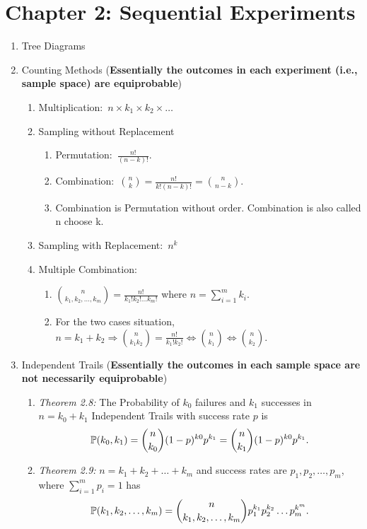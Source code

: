 \section*{Chapter 2: Sequential Experiments}
\begin{enumerate}
    \item Tree Diagrams
    \item Counting Methods (\textbf{Essentially the outcomes in each experiment (i.e., sample space) are equiprobable})
    \begin{enumerate}
        \item Multiplication:~$n\times k_1\times k_2\times \ldots$
        \item Sampling without Replacement
        \begin{enumerate}
            \item Permutation:~$\frac{n!}{(n-k)!}$.
            \item Combination:~$\binom{n}{k}=\frac{n!}{k!(n-k)!}=\binom{n}{n-k}$.
            \item Combination is Permutation without order. Combination is also called n choose k.
        \end{enumerate}
        \item Sampling with Replacement:~$n^k$
        \item Multiple Combination:{
            \begin{enumerate}
                \item $\binom{n}{k_1,k_2,\ldots,k_m}=\frac{n!}{k_1!k_2!\ldots k_m!}$ where $n=\sum_{i=1}^{m}k_i$.
                \item For the two cases situation, $n=k_1+k_2\Rightarrow \binom{n}{k_1k_2}=\frac{n!}{k_1!k_2!}\iff\binom{n}{k_1}\iff\binom{n}{k_2}$.
            \end{enumerate}
            }
    \end{enumerate}
    \item Independent Trails (\textbf{Essentially the outcomes in each sample space are not necessarily equiprobable})
    \begin{enumerate}
        \item \textit{Theorem 2.8:} The Probability of $k_0$ failures and $k_1$ successes in $n=k_0+k_1$ Independent Trails with success rate $p$ is \[\P{k_0, k_1}=\binom{n}{k_0}(1-p)^{k0}p^{k_1}=\binom{n}{k_1}(1-p)^{k0}p^{k_1}.\]
        \item \textit{Theorem 2.9:} $n=k_1+k_2+\ldots+k_m$ and success rates are $p_1, p_2,\ldots,p_m$, where $\sum_{i=1}^{m}p_i=1$ has 
        \[\P{k_1,k_2,\ldots,k_m}=\binom{n}{k_1,k_2,\ldots,k_m}p_1^{k_1}p_2^{k_2}\ldots p_m^{k^m}.\]
    \end{enumerate}
\end{enumerate}